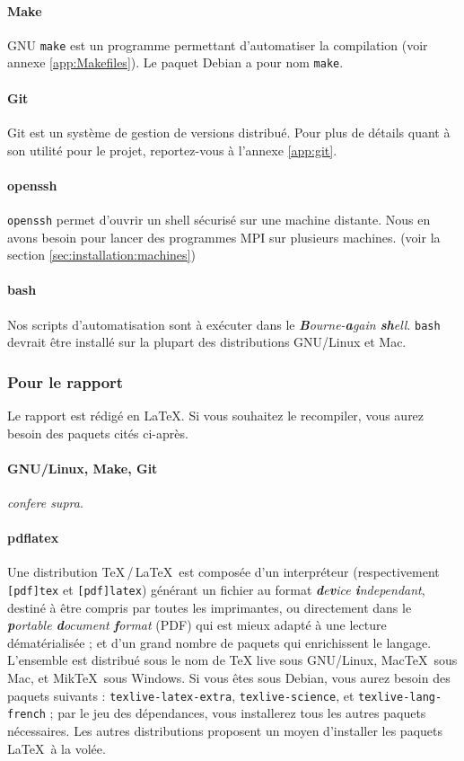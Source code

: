 \paragraph{Make}
GNU \texttt{make} est un programme permettant d'automatiser la
compilation (voir annexe \ref{app:Makefiles}). Le paquet Debian a pour
nom \texttt{make}.

\paragraph{Git}
Git est un système de gestion de versions distribué. Pour plus de
détails quant à son utilité pour le projet, reportez-vous à l'annexe
\ref{app:git}.

\paragraph{openssh}
\texttt{openssh} permet d'ouvrir un shell sécurisé sur une machine
distante. Nous en avons besoin pour lancer des programmes MPI sur
plusieurs machines. (voir la section \ref{sec:installation:machines})

\paragraph{bash}
Nos scripts d'automatisation sont à exécuter dans le
\emph{\textbf{B}ourne-\textbf{a}gain \textbf{sh}ell}. \texttt{bash}
devrait être installé sur la plupart des distributions GNU/Linux et
Mac.

\subsubsection{Pour le rapport}

Le rapport est rédigé en \LaTeX. Si vous souhaitez le recompiler, vous
aurez besoin des paquets cités ci-après.


\paragraph{GNU/Linux, Make, Git} \emph{confere supra}.

\paragraph{pdflatex}
Une distribution \TeX\,/\,\LaTeX\ est composée d'un interpréteur
(respectivement \texttt{[pdf]tex} et \texttt{[pdf]latex}) générant un
fichier au format \emph{\textbf{d}e\textbf{v}ice
  \textbf{i}ndependant}, destiné à être compris par toutes les
imprimantes, ou directement dans le \emph{\textbf{p}ortable
  \textbf{d}ocument \textbf{f}ormat} (PDF) qui est mieux adapté à une
lecture dématérialisée ; et d'un grand nombre de paquets qui
enrichissent le langage. L'ensemble est distribué sous le nom de \TeX
live sous GNU/Linux, Mac\TeX\ sous Mac, et Mik\TeX\ sous Windows. Si
vous êtes sous Debian, vous aurez besoin des paquets suivants :
\texttt{texlive-latex-extra}, \texttt{texlive-science}, et
\texttt{texlive-lang-french} ; par le jeu des dépendances, vous
installerez tous les autres paquets nécessaires. Les autres
distributions proposent un moyen d'installer les paquets \LaTeX\ à la
volée.


